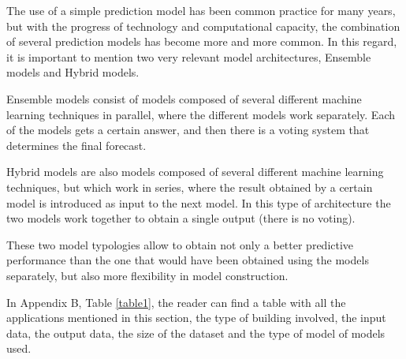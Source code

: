 The use of a simple prediction model has been common practice for many years, but with the progress of technology and computational capacity, the combination of several prediction models has become more and more common. In this regard, it is important to mention two very relevant model architectures, Ensemble models and Hybrid models. 

Ensemble models consist of models composed of several different machine learning techniques in parallel, where the different models work separately. Each of the models gets a certain answer, and then there is a voting system that determines the final forecast. 

Hybrid models are also models composed of several different machine learning techniques, but which work in series, where the result obtained by a certain model is introduced as input to the next model. In this type of architecture the two models work together to obtain a single output (there is no voting).

These two model typologies allow to obtain not only a better predictive performance than the one that would have been obtained using the models separately, but also more flexibility in model construction.

In Appendix B, Table \ref{table1}, the reader can find a table with all the applications mentioned in this section, the type of building involved, the input data, the output data, the size of the dataset and the type of model of models used.


